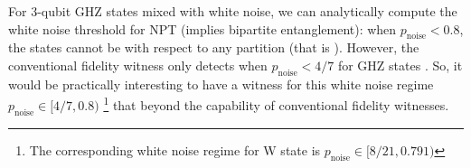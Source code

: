 \documentclass[
aps,
pra,
twocolumn,
floatfix,
]{revtex4-2}
\theoremstyle{plain}
\newtheorem{proposition}{Proposition}
\theoremstyle{definition}
\newtheorem{example}{Example}
\newcommand{\ew}{W}
\newcommand{\dm}{\rho}
\newcommand{\noise}{\text{noise}}
\begin{document}
For 3-qubit GHZ states mixed with white noise, we can analytically compute the white noise threshold for NPT (implies bipartite entanglement):
when $p_{\noise}<0.8$, the states cannot be  with respect to any partition (that is ).
However, the conventional fidelity witness only detects  when $p_{\noise}<4/7$ for GHZ states \cite{guhneEntanglementDetection2009}.
So, it would be practically interesting to have a witness for this white noise regime $p_\noise\in[4/7,0.8)$ 
\footnote{The corresponding white noise regime for W state is $p_\noise\in[8/21,0.791)$} 
that beyond the capability of conventional fidelity witnesses.



\end{document}
